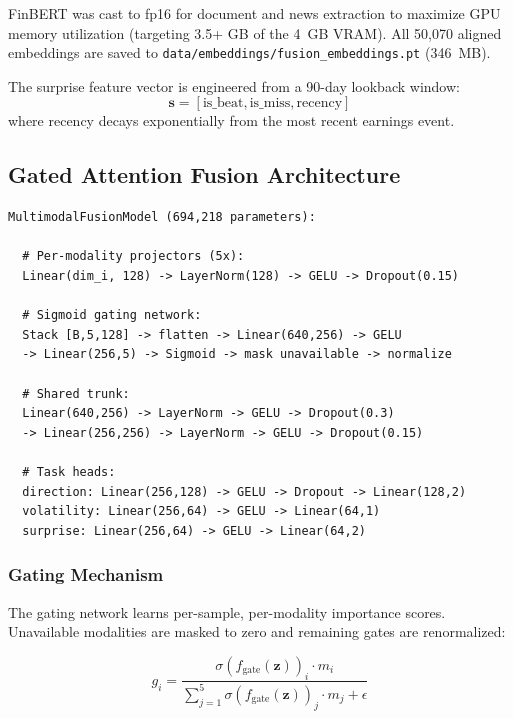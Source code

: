 \documentclass[12pt,a4paper]{article}
\begin{document}
\noindent FinBERT was cast to fp16 for document and news extraction to maximize GPU memory utilization (targeting 3.5+ GB of the 4~GB VRAM). All 50,070 aligned embeddings are saved to \texttt{data/embeddings/fusion\_embeddings.pt} (346~MB).

The surprise feature vector is engineered from a 90-day lookback window:
\begin{equation}
\mathbf{s} = [\text{is\_beat}, \text{is\_miss}, \text{recency}]
\end{equation}
where recency decays exponentially from the most recent earnings event.

\subsection{Gated Attention Fusion Architecture}

\begin{lstlisting}[caption={MultimodalFusionModel architecture (\texttt{src/models/fusion\_model.py})}]
MultimodalFusionModel (694,218 parameters):

  # Per-modality projectors (5x):
  Linear(dim_i, 128) -> LayerNorm(128) -> GELU -> Dropout(0.15)

  # Sigmoid gating network:
  Stack [B,5,128] -> flatten -> Linear(640,256) -> GELU
  -> Linear(256,5) -> Sigmoid -> mask unavailable -> normalize

  # Shared trunk:
  Linear(640,256) -> LayerNorm -> GELU -> Dropout(0.3)
  -> Linear(256,256) -> LayerNorm -> GELU -> Dropout(0.15)

  # Task heads:
  direction: Linear(256,128) -> GELU -> Dropout -> Linear(128,2)
  volatility: Linear(256,64) -> GELU -> Linear(64,1)
  surprise: Linear(256,64) -> GELU -> Linear(64,2)
\end{lstlisting}

\subsubsection{Gating Mechanism}

The gating network learns per-sample, per-modality importance scores. Unavailable modalities are masked to zero and remaining gates are renormalized:

\begin{equation}
g_i = \frac{\sigma(f_{\text{gate}}(\mathbf{z}))_i \cdot m_i}{\sum_{j=1}^{5} \sigma(f_{\text{gate}}(\mathbf{z}))_j \cdot m_j + \epsilon}
\end{equation}
\end{document}
